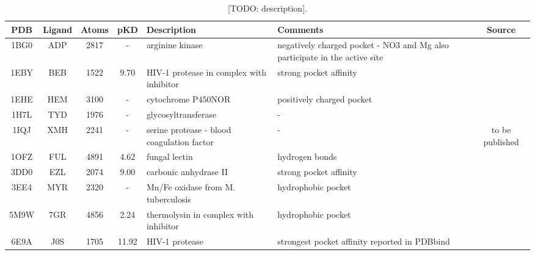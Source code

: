   \begin{table}[H]
    \caption{\label{tab:appx1/benchmark_prot} [TODO: description].}
    \centering
    \begin{tabular}{ccccp{1.5in}p{1.5in}c}
      \hline
      PDB  & Ligand  & Atoms & pKD   & Description                                & Comments                                                                   & Source                            \\ \hline
      1BG0 & ADP     & 2817  & -     & arginine kinase                            & negatively charged pocket - NO3 and Mg also participate in the active site & \cite{benchmark_negative_2000}    \\ \hline
      1EBY & BEB     & 1522  & 9.70  & HIV-1 protease in complex with inhibitor   & strong pocket affinity                                                     & \cite{benchmark_strong_2021}      \\ \hline
      1EHE & HEM     & 3100  & -     & cytochrome P450NOR                         & positively charged pocket                                                  & \cite{benchmark_positive_2001}    \\ \hline
      1H7L & TYD     & 1976  & -     & glycosyltransferase                        & -                                                                          & \cite{benchmark_1h7l_2001}        \\ \hline
      1IQJ & XMH     & 2241  & -     & serine protease - blood coagulation factor & -                                                                          & to be published                   \\ \hline
      1OFZ & FUL     & 4891  & 4.62  & fungal lectin                              & hydrogen bonds                                                             & \cite{hbonds_2023}                \\ \hline
      3DD0 & EZL     & 2074  & 9.00  & carbonic anhydrase II                      & strong pocket affinity                                                     & \cite{benchmark_strong_2021}      \\ \hline
      3EE4 & MYR     & 2320  & -     & Mn/Fe oxidase from M. tuberculosis         & hydrophobic pocket                                                         & \cite{benchmark_hydrophobic_2009} \\ \hline
      5M9W & 7GR     & 4856  & 2.24  & thermolysin in complex with inhibitor      & hydrophobic pocket                                                         & \cite{hydrophobic_2017}           \\ \hline
      6E9A & J0S     & 1705  & 11.92 & HIV-1 protease                             & strongest pocket affinity reported in PDBbind                              & \cite{pdbbind_2004}               \\ \hline
    \end{tabular}
  \end{table}

